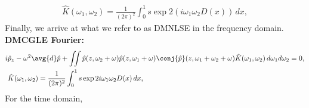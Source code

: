 \begin{equation}
\begin{split}
\hat{K}(\omega_1,\omega_2) = \frac{1}{(2\pi)^2}\int_{0}^{1} s \exp{2\left(i\omega_1\omega_2 D(x) \right) } \,dx,
\end{split}
\end{equation}
Finally, we arrive at what we refer to as DMNLSE in the frequency domain.\\
\textbf{DMCGLE Fourier:}
\begin{equation}\label{equ:DMCGLE_Fourier}
\begin{split}
i&\hat{p}_z - \omega^2 \avg{d} \hat{p} +\iint \hat{p}(z,\omega_2+\omega) \hat{p}(z,\omega_1+\omega) \conj{\hat{p}}(z,\omega_1+\omega_2+\omega) \hat{K}(\omega_1,\omega_2)  \,d\omega_1 d\omega_2= 0, \\
& \hat{K}(\omega_1,\omega_2) = \frac{1}{(2\pi)^2}\int_{0}^{1} s \exp{2i\omega_1\omega_2 D(x) }  \,dx,  \\
\end{split}
\end{equation}
For the time domain,
